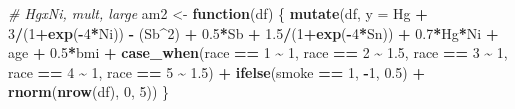 \documentclass[12pt, twoside]{amherstthesis}
\newenvironment{Shaded}{\begin{snugshade}}{\end{snugshade}}
\newcommand{\AttributeTok}[1]{\textcolor[rgb]{0.13,0.29,0.53}{#1}}
\newcommand{\CommentTok}[1]{\textcolor[rgb]{0.56,0.35,0.01}{\textit{#1}}}
\newcommand{\ControlFlowTok}[1]{\textcolor[rgb]{0.13,0.29,0.53}{\textbf{#1}}}
\newcommand{\DecValTok}[1]{\textcolor[rgb]{0.00,0.00,0.81}{#1}}
\newcommand{\FloatTok}[1]{\textcolor[rgb]{0.00,0.00,0.81}{#1}}
\newcommand{\FunctionTok}[1]{\textcolor[rgb]{0.13,0.29,0.53}{\textbf{#1}}}
\newcommand{\NormalTok}[1]{#1}
\newcommand{\OtherTok}[1]{\textcolor[rgb]{0.56,0.35,0.01}{#1}}
\newcommand{\SpecialCharTok}[1]{\textcolor[rgb]{0.81,0.36,0.00}{\textbf{#1}}}
\begin{document}
\begin{Shaded}
\begin{Highlighting}[]
\CommentTok{\# HgxNi, mult, large}
\NormalTok{am2 }\OtherTok{\textless{}{-}} \ControlFlowTok{function}\NormalTok{(df) \{}
  \FunctionTok{mutate}\NormalTok{(df, }\AttributeTok{y =} 
\NormalTok{           Hg }\SpecialCharTok{+} \DecValTok{3}\SpecialCharTok{/}\NormalTok{(}\DecValTok{1}\SpecialCharTok{+}\FunctionTok{exp}\NormalTok{(}\SpecialCharTok{{-}}\DecValTok{4}\SpecialCharTok{*}\NormalTok{Ni)) }\SpecialCharTok{{-}}\NormalTok{ (Sb}\SpecialCharTok{\^{}}\DecValTok{2}\NormalTok{) }\SpecialCharTok{+} \FloatTok{0.5}\SpecialCharTok{*}\NormalTok{Sb }\SpecialCharTok{+} \FloatTok{1.5}\SpecialCharTok{/}\NormalTok{(}\DecValTok{1}\SpecialCharTok{+}\FunctionTok{exp}\NormalTok{(}\SpecialCharTok{{-}}\DecValTok{4}\SpecialCharTok{*}\NormalTok{Sn)) }\SpecialCharTok{+} 
           \FloatTok{0.7}\SpecialCharTok{*}\NormalTok{Hg}\SpecialCharTok{*}\NormalTok{Ni }\SpecialCharTok{+} 
\NormalTok{           age }\SpecialCharTok{+} \FloatTok{0.5}\SpecialCharTok{*}\NormalTok{bmi }\SpecialCharTok{+} 
           \FunctionTok{case\_when}\NormalTok{(race }\SpecialCharTok{==} \DecValTok{1} \SpecialCharTok{\textasciitilde{}} \DecValTok{1}\NormalTok{, }
\NormalTok{                     race }\SpecialCharTok{==} \DecValTok{2} \SpecialCharTok{\textasciitilde{}} \FloatTok{1.5}\NormalTok{, }
\NormalTok{                     race }\SpecialCharTok{==} \DecValTok{3} \SpecialCharTok{\textasciitilde{}} \DecValTok{1}\NormalTok{, }
\NormalTok{                     race }\SpecialCharTok{==} \DecValTok{4} \SpecialCharTok{\textasciitilde{}} \DecValTok{1}\NormalTok{, }
\NormalTok{                     race }\SpecialCharTok{==} \DecValTok{5} \SpecialCharTok{\textasciitilde{}} \FloatTok{1.5}\NormalTok{) }\SpecialCharTok{+}
           \FunctionTok{ifelse}\NormalTok{(smoke }\SpecialCharTok{==} \DecValTok{1}\NormalTok{, }\SpecialCharTok{{-}}\DecValTok{1}\NormalTok{, }\FloatTok{0.5}\NormalTok{) }\SpecialCharTok{+}
           \FunctionTok{rnorm}\NormalTok{(}\FunctionTok{nrow}\NormalTok{(df), }\DecValTok{0}\NormalTok{, }\DecValTok{5}\NormalTok{))}
\NormalTok{\}}


\end{Highlighting}
\end{Shaded}
\end{document}
